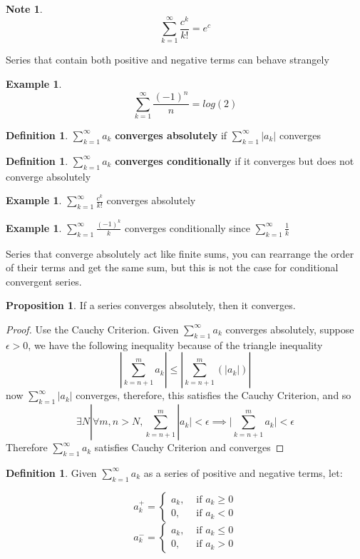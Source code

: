 \documentclass[12pt]{article}
\theoremstyle{plain}
\newtheorem*{note}{Note}
\theoremstyle{definition}
\newtheorem{definition}[theorem]{Definition}
\newtheorem{example}[theorem]{Example}
\newtheorem{proposition}[theorem]{Proposition}
\begin{document}
\begin{note}
	$$\sum^\infty_{k=1} \frac{c^k}{k!} = e^c$$
\end{note}

Series that contain both positive and negative terms can behave strangely

\begin{example}
	$$\sum^\infty_{k=1} \frac{(-1)^n}{n} = log(2)$$
\end{example}

\begin{definition}
	$\sum^\infty_{k=1} a_k$ \textbf{converges absolutely} if $\sum^\infty_{k=1} |a_k|$ converges
\end{definition}

\begin{definition}
	$\sum^\infty_{k=1} a_k$ \textbf{converges conditionally} if it converges but does not converge absolutely
\end{definition}

\begin{example}
	$\sum^\infty_{k=1} \frac{c^k}{k!}$ converges absolutely
\end{example}

\begin{example}
	$\sum^\infty_{k=1} \frac{(-1)^k}{k}$ converges conditionally since $\sum^\infty_{k=1} \frac{1}{k}$
\end{example}

Series that converge absolutely act like finite sums, you can rearrange the order of their terms and get the same sum, but this is not the case for conditional convergent series.

\begin{proposition}
	If a series converges absolutely, then it converges.
\end{proposition}

\begin{proof}
	Use the Cauchy Criterion. Given $\sum^\infty_{k=1} a_k$ converges absolutely, suppose $\epsilon > 0$, we have the following inequality because of the triangle inequality
	$$|\sum^m_{k=n+1} a_k| \leq |\sum^m_{k=n+1} (|a_k|) |$$
	now $\sum^\infty_{k=1} |a_k|$ converges, therefore, this satisfies the Cauchy Criterion, and so 
	$$\exists N | \forall m,n > N, \sum^m_{k=n+1} |a_k| < \epsilon \implies |\sum^m_{k=n+1} a_k|<\epsilon$$
	Therefore $\sum^\infty_{k=1} a_k$ satisfies Cauchy Criterion and converges
\end{proof}

\begin{definition}
	Given $\sum^\infty_{k=1} a_k$ as a series of positive and negative terms, let:
	
	$$a_k^+ = \begin{cases}
		a_k, &\text{ if } a_k \geq 0\\
		0, &\text{ if } a_k < 0
	\end{cases}
$$
$$a_k^- = \begin{cases}
		a_k, &\text{ if } a_k \leq 0\\
		0, &\text{ if } a_k > 0
	\end{cases}
$$
\end{definition}
\end{document}
